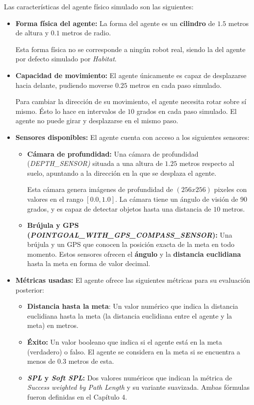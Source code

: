 Las características del agente físico simulado son las siguientes:
\begin{itemize}
	\item \textbf{Forma física del agente:} La forma del agente es un \textbf{cilindro} de $1.5$ metros de altura y $0.1$ metros de radio.
	
	Esta forma física no se corresponde a ningún robot real, siendo la del agente por defecto simulado por \textit{Habitat}.
	\item \textbf{Capacidad de movimiento:} El agente únicamente es capaz de desplazarse hacia delante, pudiendo moverse $0.25$ metros en cada paso simulado.
	
	Para cambiar la dirección de su movimiento, el agente necesita rotar sobre sí mismo. Ésto lo hace en intervalos de $10$ grados en cada paso simulado. El agente no puede girar y desplazarse en el mismo paso.
	\item \textbf{Sensores disponibles:} El agente cuenta con acceso a los siguientes sensores:
	\begin{itemize}
		\item \textbf{Cámara de profundidad:} Una cámara de profundidad (\textit{DEPTH{\_}SENSOR)} situada a una altura de $1.25$ metros respecto al suelo, apuntando a la dirección en la que se desplaza el agente.
		
		Esta cámara genera imágenes de profundidad de $(256x256)$ pixeles con valores en el rango $[0.0, 1.0]$. La cámara tiene un ángulo de visión de $90$ grados, y es capaz de detectar objetos hasta una distancia de $10$ metros.
		\item \textbf{Brújula y GPS (\textit{POINTGOAL{\_}WITH{\_}GPS{\_}COMPASS{\_}SENSOR}):} Una brújula y un GPS que conocen la posición exacta de la meta en todo momento. Estos sensores ofrecen el \textbf{ángulo} y la \textbf{distancia euclidiana} hasta la meta en forma de valor decimal.
	\end{itemize}
	\item \textbf{Métricas usadas:} El agente ofrece las siguientes métricas para su evaluación posterior:
	\begin{itemize}
		\item \textbf{Distancia hasta la meta}: Un valor numérico que indica la distancia euclidiana hasta la meta (la distancia euclidiana entre el agente y la meta) en metros.
		\item \textbf{Éxito:} Un valor booleano que indica si el agente está en la meta (verdadero) o falso. El agente se considera en la meta si se encuentra a menos de $0.3$ metros de esta.
		\item \textbf{\textit{SPL} y \textit{Soft SPL}:} Dos valores numéricos que indican la métrica de \textit{Success weighted by Path Length} \cite{DBLP:journals/corr/abs-1807-06757} y su variante suavizada. Ambas fórmulas fueron definidas en el Capítulo 4.
	\end{itemize}
\end{itemize}

